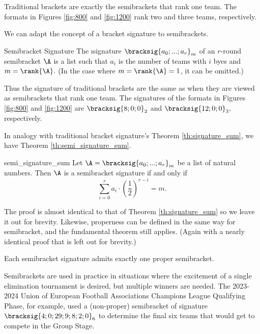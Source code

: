 {    Traditional brackets are exactly the semibrackets that rank one team. The formats in Figures \ref{fig:800} and \ref{fig:1200} rank two and three teams, respectively.

    We can adapt the concept of a bracket signature to semibrackets.

    \begin{definition}{Semibracket Signature}{}
        The \i{signature} $\bracksig{a_0; ...; a_r}_m$ of an $r$-round semibracket $\A$ is a list such that $a_i$ is the number of teams with $i$ byes and $m = \rank{\A}.$ (In the case where $m = \rank{\A} = 1$, it can be omitted.)
    \end{definition}

    Thus the signature of traditional brackets are the same as when they are viewed as semibrackets that rank one team. The signatures of the formats in Figures \ref{fig:800} and \ref{fig:1200} are $\bracksig{8;0;0}_2$ and $\bracksig{12;0;0}_3,$ respectively.

    In analogy with traditional bracket signature's Theorem \ref{th:signature_sum}, we have Theorem \ref{th:semi_signature_sum}.

    \begin{theorem}{}{semi_signature_sum}
        Let $\A = \bracksig{a_0; ...; a_r}_m$ be a list of natural numbers. Then $\A$ is a semibracket signature if and only if $$\sum_{i=0}^r a_i \cdot \left(\frac{1}{2}\right)^{r - i} = m.$$
    \end{theorem}

    The proof is almost identical to that of Theorem \ref{th:signature_sum} so we leave it out for brevity. Likewise, properness can be defined in the same way for semibracket, and the fundamental theorem still applies. (Again with a nearly identical proof that is left out for brevity.)

    \begin{theorem}{}{}
        Each semibracket signature admits exactly one proper semibracket.
    \end{theorem}

    Semibrackets are used in practice in situations where the excitement of a single elimination tournament is desired, but multiple winners are needed. The 2023-2024 Union of European Football Associations Champions League Qualifying Phase, for example, used a (non-proper) semibracket of signature $\bracksig{4;0;29;9;8;2;0}_6$ to determine the final six teams that would get to compete in the Group Stage.

}
